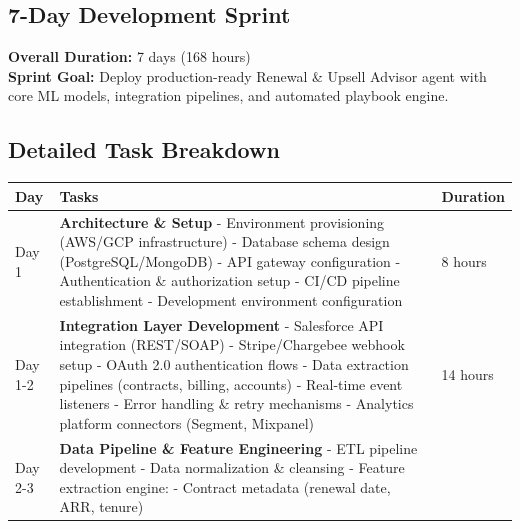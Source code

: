 \documentclass[12pt,a4paper]{article}
\begin{document}
\subsection{7-Day Development Sprint}
\textbf{Overall Duration:} 7 days (168 hours)\\
\textbf{Sprint Goal:} Deploy production-ready Renewal \& Upsell Advisor agent with core ML models, integration pipelines, and automated playbook engine.

\subsection{Detailed Task Breakdown}
\begin{longtable}{|p{2cm}|p{10cm}|p{2cm}|}
\hline
\textbf{Day} & \textbf{Tasks} & \textbf{Duration} \\
\hline
Day 1 & \textbf{Architecture \& Setup} \newline
- Environment provisioning (AWS/GCP infrastructure) \newline
- Database schema design (PostgreSQL/MongoDB) \newline
- API gateway configuration \newline
- Authentication \& authorization setup \newline
- CI/CD pipeline establishment \newline
- Development environment configuration & 8 hours \\
\hline
Day 1-2 & \textbf{Integration Layer Development} \newline
- Salesforce API integration (REST/SOAP) \newline
- Stripe/Chargebee webhook setup \newline
- OAuth 2.0 authentication flows \newline
- Data extraction pipelines (contracts, billing, accounts) \newline
- Real-time event listeners \newline
- Error handling \& retry mechanisms \newline
- Analytics platform connectors (Segment, Mixpanel) & 14 hours \\
\hline
Day 2-3 & \textbf{Data Pipeline \& Feature Engineering} \newline
- ETL pipeline development \newline
- Data normalization \& cleansing \newline
- Feature extraction engine: \newline
\hspace*{0.5cm} - Contract metadata (renewal date, ARR, tenure) \newline

\end{longtable}
\end{document}

